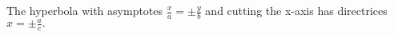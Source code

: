  The hyperbola with asymptotes $  \frac{x}{a} = \pm \frac{y}{b} $
and cutting the x-axis
has directrices $ x = \pm \frac{a}{e} . $
